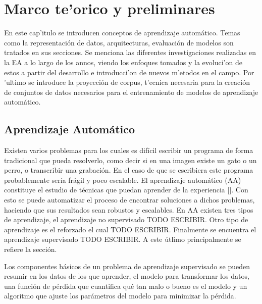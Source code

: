 \chapter{Marco te'orico y preliminares}\label{chapter:background}


En este cap'itulo se introducen conceptos de aprendizaje automático. Temas
como la representación de datos, arquitecturas, evaluación de modelos son tratados en sus secciones.
Se menciona las diferentes investigaciones realizadas en la EA a lo largo de los annos, viendo
los enfoques tomados y la evoluci'on de estos a partir del desarrollo e introducci'on de nuevos m'etodos en el
campo. Por 'ultimo se introduce la proyección de corpus, t'ecnica necesaria para la creación de conjuntos 
de datos necesarios para el entrenamiento de modelos de aprendizaje automático.

\section{Aprendizaje Automático}

Existen varios problemas para los cuales es difícil escribir un programa de forma tradicional que pueda
resolverlo, como decir si en una imagen existe un gato o un perro, o transcribir una grabación. En el caso
de que se escribiera este programa probablemente sería frágil y poco escalable. El aprendizaje automático
(AA) constituye el estudio de técnicas que puedan 
aprender de la experiencia [\cite{d2l}]. Con esto se puede automatizar el proceso de encontrar soluciones a 
dichos problemas, haciendo que sus resultados sean robustos y escalables. En AA existen tres tipos de 
aprendizaje, el aprendizaje no supervisado TODO ESCRIBIR. Otro tipo de aprendizaje es el reforzado el cual 
TODO ESCRIBIR. Finalmente se encuentra el aprendizaje supervisado TODO ESCRIBIR. A este útlimo principalmente 
se refiere la sección.

Los componentes básicos de un problema de aprendizaje supervisado se pueden resumir en los datos de los que 
aprender, el modelo para transformar los datos, una función de pérdida que cuantifica qué tan malo o bueno es el 
modelo y un algoritmo que ajuste los parámetros del modelo para minimizar la pérdida.


